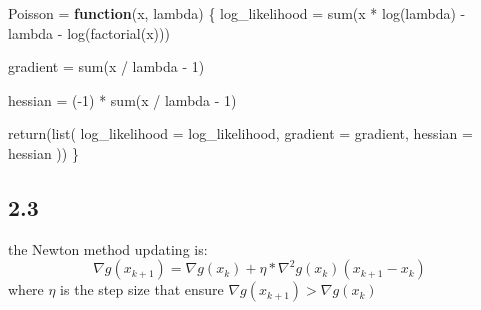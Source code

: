 \documentclass[
]{article}
\newenvironment{Shaded}{\begin{snugshade}}{\end{snugshade}}
\newcommand{\AttributeTok}[1]{\textcolor[rgb]{0.77,0.63,0.00}{#1}}
\newcommand{\ControlFlowTok}[1]{\textcolor[rgb]{0.13,0.29,0.53}{\textbf{#1}}}
\newcommand{\DecValTok}[1]{\textcolor[rgb]{0.00,0.00,0.81}{#1}}
\newcommand{\FunctionTok}[1]{\textcolor[rgb]{0.00,0.00,0.00}{#1}}
\newcommand{\NormalTok}[1]{#1}
\newcommand{\OtherTok}[1]{\textcolor[rgb]{0.56,0.35,0.01}{#1}}
\newcommand{\SpecialCharTok}[1]{\textcolor[rgb]{0.00,0.00,0.00}{#1}}
\begin{document}
\begin{Shaded}
\begin{Highlighting}[]
\NormalTok{Poisson }\OtherTok{=}
  \ControlFlowTok{function}\NormalTok{(x,}
\NormalTok{           lambda) \{}
\NormalTok{    log\_likelihood }\OtherTok{=} \FunctionTok{sum}\NormalTok{(x }\SpecialCharTok{*} \FunctionTok{log}\NormalTok{(lambda) }\SpecialCharTok{{-}}\NormalTok{ lambda }\SpecialCharTok{{-}} \FunctionTok{log}\NormalTok{(}\FunctionTok{factorial}\NormalTok{(x)))}
    
\NormalTok{    gradient }\OtherTok{=} \FunctionTok{sum}\NormalTok{(x }\SpecialCharTok{/}\NormalTok{ lambda }\SpecialCharTok{{-}} \DecValTok{1}\NormalTok{)}
    
\NormalTok{    hessian }\OtherTok{=}\NormalTok{ (}\SpecialCharTok{{-}}\DecValTok{1}\NormalTok{) }\SpecialCharTok{*} \FunctionTok{sum}\NormalTok{(x }\SpecialCharTok{/}\NormalTok{ lambda }\SpecialCharTok{{-}} \DecValTok{1}\NormalTok{)}
    
    \FunctionTok{return}\NormalTok{(}\FunctionTok{list}\NormalTok{(}
      \AttributeTok{log\_likelihood =}\NormalTok{ log\_likelihood,}
      \AttributeTok{gradient =}\NormalTok{ gradient,}
      \AttributeTok{hessian =}\NormalTok{ hessian}
\NormalTok{    ))}
\NormalTok{  \}}
\end{Highlighting}
\end{Shaded}

\hypertarget{section-2}{%
\subsection{2.3}\label{section-2}}

the Newton method updating is:
\[\nabla g(x_{k+1}) = \nabla g(x_k) + \eta*\nabla^2 g(x_k)(x_{k+1}-x_k)\]
where \(\eta\) is the step size that ensure
\(\nabla g(x_{k+1}) > \nabla g(x_k)\)
\end{document}
